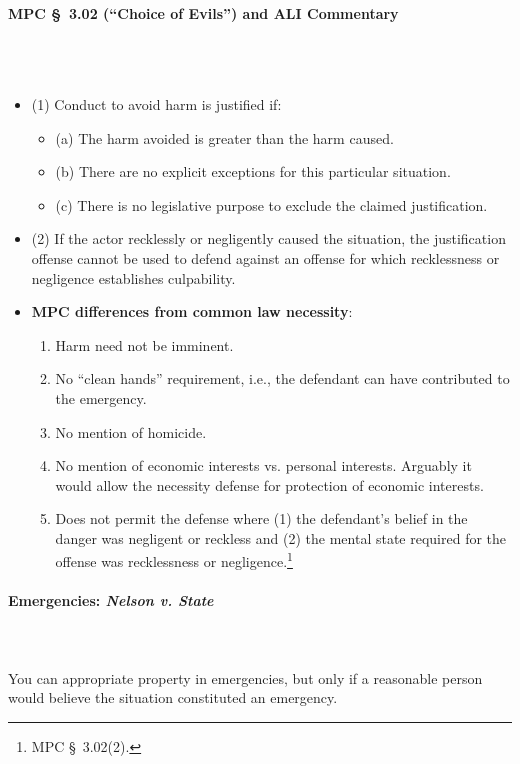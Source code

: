 \paragraph{MPC \S\ 3.02 (``Choice of Evils'') and ALI Commentary}
~\\\\
\begin{itemize}
    \item (1) Conduct to avoid harm is justified if:
    \begin{itemize}
        \item (a) The harm avoided is greater than the harm caused.
        \item (b) There are no explicit exceptions for this particular 
        situation.
        \item (c) There is no legislative purpose to exclude the claimed 
        justification.
    \end{itemize}
    \item (2) If the actor recklessly or negligently caused the situation, the 
    justification offense cannot be used to defend against an offense for 
    which recklessness or negligence establishes culpability.
    \item \textbf{MPC differences from common law necessity}:
    \begin{enumerate}
        \item Harm need not be imminent.
        \item No ``clean hands'' requirement, i.e., the defendant can have contributed to the emergency.
        \item No mention of homicide.
        \item No mention of economic interests vs. personal interests. 
        Arguably it would allow the necessity defense for protection of 
        economic interests.
        \item Does not permit the defense where (1) the defendant's belief in the 
        danger was negligent or reckless and (2) the mental state required for 
        the offense was recklessness or negligence.\footnote{MPC \S\ 3.02(2).}
    \end{enumerate}
\end{itemize}

\paragraph{Emergencies: \emph{Nelson v. State}}
~\\\\
You can appropriate property in emergencies, but only if a reasonable person 
would believe the situation constituted an emergency.

